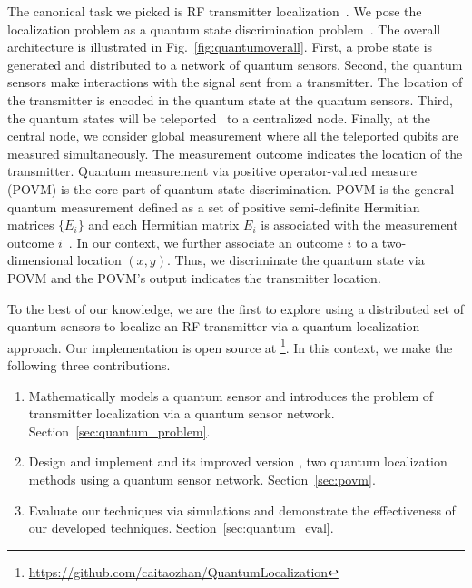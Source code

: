 The canonical task we picked is RF transmitter localization~\cite{nsdi13-arraytrack,pmc22-deepmtlpro}.
We pose the localization problem as a quantum state discrimination problem~\cite{bergou-review-2007}. 
The overall architecture is illustrated in Fig.~\ref{fig:quantumoverall}.
First, a probe state is generated and distributed to a network of quantum sensors.
Second, the quantum sensors make interactions with the signal sent from a transmitter. 
The location of the transmitter is encoded in the quantum state at the quantum sensors.
Third, the quantum states will be teleported~\cite{tqe22-quantum} to a centralized node.
Finally, at the central node, we consider global measurement where all the teleported qubits are measured simultaneously. 
The measurement outcome indicates the location of the transmitter.
Quantum measurement via positive operator-valued measure (POVM) is the core part of quantum state discrimination.
POVM is the general quantum measurement defined as a set of positive semi-definite Hermitian matrices $\{E_i\}$ and each Hermitian matrix $E_i$ is associated with the measurement outcome $i$~\cite{qcqi-book}.
In our context, we further associate an outcome $i$ to a two-dimensional location $(x, y)$.
Thus, we discriminate the quantum state via POVM and the POVM's output indicates the transmitter location.


To the best of our knowledge, we are the first to explore using a distributed set of quantum sensors to localize an RF transmitter via a quantum localization approach. 
Our implementation is open source at \footnote{\url{https://github.com/caitaozhan/QuantumLocalization}}.
In this context, we make the following three contributions.
\begin{enumerate}
    \item Mathematically models a quantum sensor and introduces the problem of transmitter localization via a quantum sensor network. Section~\ref{sec:quantum_problem}.
    \item Design and implement \povm and its improved version \povmpro, two quantum localization methods using a quantum sensor network. Section~\ref{sec:povm}.
    \item Evaluate our techniques via simulations and demonstrate the effectiveness of our developed techniques. Section~\ref{sec:quantum_eval}.
\end{enumerate}
